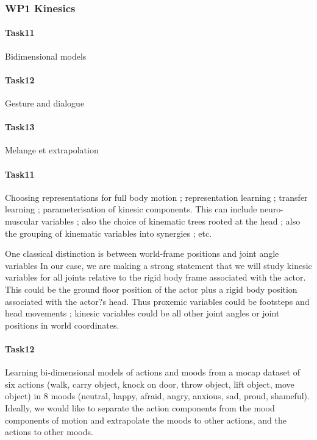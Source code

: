 

\subsubsection{WP1 Kinesics}




\paragraph{Task11} Bidimensional models



\paragraph{Task12} Gesture and dialogue



\paragraph{Task13} Melange et extrapolation


\paragraph{Task11}  Choosing representations for full body motion ; representation learning ; transfer learning ; parameterisation of kinesic components. This can include neuro-muscular variables ; also the choice of kinematic trees rooted at the head ; also the grouping of kinematic variables into synergies ; etc. 

One classical distinction is between world-frame positions and joint angle variables In our case, we are making a strong statement that we will  study kinesic variables for all joints relative to the rigid body frame associated with the actor. This could be the ground floor position of the actor plus a rigid body position associated with the actor?s head.  Thus proxemic variables could be footsteps and head movements ; kinesic variables could be all other joint angles or joint positions in world coordinates.

\paragraph{Task12} Learning bi-dimensional models of actions and moods from a mocap dataset of six actions (walk, carry object, knock on door, throw object, lift object, move object) in 8 moods (neutral, happy, afraid, angry, anxious, sad, proud, shameful). Ideally, we would like to separate the action components from the mood components of motion and extrapolate the moods to other actions, and the actions to other moods. 

